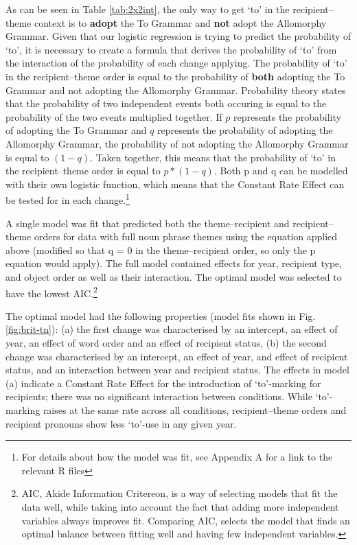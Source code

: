 	As can be seen in Table \ref{tab:2x2int}, the only way to get `to' in the recipient--theme context is to \textbf{adopt} the To Grammar and \textbf{not} adopt the Allomorphy Grammar. Given that our logistic regression is trying to predict the probability of `to', it is necessary to create a formula that derives the probability of `to' from the interaction of the probability of each change applying. The probability of `to' in the recipient--theme order is equal to the probability of \textbf{both} adopting the To Grammar and not adopting the Allomorphy Grammar. Probability theory states that the probability of two independent events both occuring is equal to the probability of the two events multiplied together. If $p$ represents the probability of adopting the To Grammar and $q$ represents the probability of adopting the Allomorphy Grammar, the probability of not adopting the Allomorphy Grammar is equal to $(1-q)$. Taken together, this means that the probability of `to' in the recipient--theme order is equal to $p * (1-q)$. Both p and q can be modelled with their own logistic function, which means that the Constant Rate Effect can be tested for in each change.\footnote{For details about how the model was fit, see Appendix A for a link to the relevant R files}

	A single model was fit that predicted both the theme--recipient and recipient--theme orders for data with full noun phrase themes using the equation applied above (modified so that q = 0 in the theme--recipient order, so only the p equation would apply). The full model contained effects for year, recipient type, and object order as well as their interaction. The optimal model was selected to have the lowest AIC.\footnote{AIC, Akide Information Critereon, is a way of selecting models that fit the data well, while taking into account the fact that adding more independent variables always improves fit. Comparing AIC, selects the model that finds an optimal balance between fitting well and having few independent variables.} 
	
	The optimal model had the following properties (model fits shown in Fig. \ref{fig:brit-tn}): (a) the first change was characterised by an intercept, an effect of year, an effect of word order and an effect of recipient status, (b) the second change was characterised by an intercept, an effect of year, and effect of recipient status, and an interaction between year and recipient status. The effects in model (a) indicate a Constant Rate Effect for the introduction of `to'-marking for recipients; there was no significant interaction between conditions. While `to'-marking raises at the same rate across all conditions, recipient--theme orders and recipient pronouns show less `to'-use in any given year. 
	
